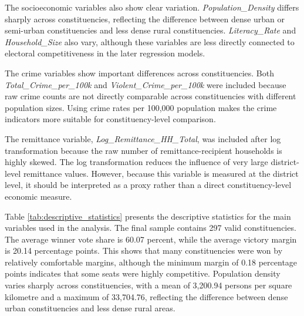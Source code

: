\documentclass[12pt,a4paper]{article}
\begin{document}
The socioeconomic variables also show clear variation. \textit{Population\_Density} differs sharply across constituencies, reflecting the difference between dense urban or semi-urban constituencies and less dense rural constituencies. \textit{Literacy\_Rate} and \textit{Household\_Size} also vary, although these variables are less directly connected to electoral competitiveness in the later regression models.

The crime variables show important differences across constituencies. Both \textit{Total\_Crime\_per\_100k} and \textit{Violent\_Crime\_per\_100k} were included because raw crime counts are not directly comparable across constituencies with different population sizes. Using crime rates per 100,000 population makes the crime indicators more suitable for constituency-level comparison.

The remittance variable, \textit{Log\_Remittance\_HH\_Total}, was included after log transformation because the raw number of remittance-recipient households is highly skewed. The log transformation reduces the influence of very large district-level remittance values. However, because this variable is measured at the district level, it should be interpreted as a proxy rather than a direct constituency-level economic measure.

Table \ref{tab:descriptive_statistics} presents the descriptive statistics for the main variables used in the analysis. The final sample contains 297 valid constituencies. The average winner vote share is 60.07 percent, while the average victory margin is 20.14 percentage points. This shows that many constituencies were won by relatively comfortable margins, although the minimum margin of 0.18 percentage points indicates that some seats were highly competitive. Population density varies sharply across constituencies, with a mean of 3,200.94 persons per square kilometre and a maximum of 33,704.76, reflecting the difference between dense urban constituencies and less dense rural areas.
\end{document}
